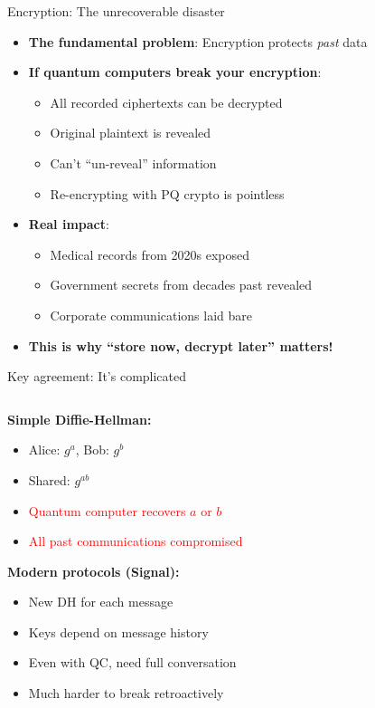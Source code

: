 \documentclass[aspectratio=169, lualatex, handout]{beamer}
\begin{document}
\begin{frame}{Encryption: The unrecoverable disaster}
	\begin{itemize}
		\item \textbf{The fundamental problem}: Encryption protects \textit{past} data
		\item \textbf{If quantum computers break your encryption}:
		      \begin{itemize}
			      \item All recorded ciphertexts can be decrypted
			      \item Original plaintext is revealed
			      \item Can't ``un-reveal'' information
			      \item Re-encrypting with PQ crypto is pointless
		      \end{itemize}
		\item \textbf{Real impact}:
		      \begin{itemize}
			      \item Medical records from 2020s exposed
			      \item Government secrets from decades past revealed
			      \item Corporate communications laid bare
		      \end{itemize}
		\item \textbf{This is why ``store now, decrypt later'' matters!}
	\end{itemize}
\end{frame}

\begin{frame}{Key agreement: It's complicated}
	\begin{columns}[c]
		\begin{column}{1\textwidth}
			\textbf{Simple Diffie-Hellman:}
			\begin{itemize}
				\item Alice: $g^a$, Bob: $g^b$
				\item Shared: $g^{ab}$
				\item \textcolor{red}{Quantum computer recovers $a$ or $b$}
				\item \textcolor{red}{All past communications compromised}
			\end{itemize}

			\textbf{Modern protocols (Signal):}
			\begin{itemize}
				\item New DH for each message
				\item Keys depend on message history
				\item Even with QC, need full conversation
				\item \textcolor{green!70!black}{Much harder to break retroactively}
			\end{itemize}
		\end{column}
	\end{columns}
\end{frame}
\end{document}
